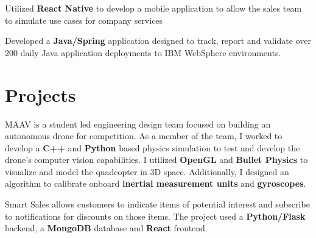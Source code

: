 \documentclass[letterpaper]{deedy-resume} %
\begin{document}
\begin{minipage}[t]{0.66\textwidth}
\sectionspace %



\begin{tightitemize}
\item Utilized {\bf React Native} to develop a mobile application to allow the sales team to simulate use cases for company services
\item Developed a {\bf Java/Spring} application designed to track, report and validate over 200 daily Java application deployments to IBM WebSphere environments.
\end{tightitemize}

\sectionspace %


\section{Projects}


MAAV is a student led engineering design team focused on building an autonomous drone for competition. As a member of the team, I worked to develop a {\bf C++} and {\bf Python} based physics simulation to test and develop the drone’s computer vision capabilities. I utilized {\bf OpenGL} and {\bf Bullet Physics} to visualize and model the quadcopter in 3D space. Additionally, I designed an algorithm to calibrate onboard {\bf inertial measurement units} and {\bf gyroscopes}.

\sectionspace %



Smart Sales allows customers to indicate items of potential interest and subscribe to notifications for discounts on those items. The project used a {\bf Python/Flask} backend, a {\bf MongoDB} database and {\bf React} frontend.


\end{minipage}
\end{document}
